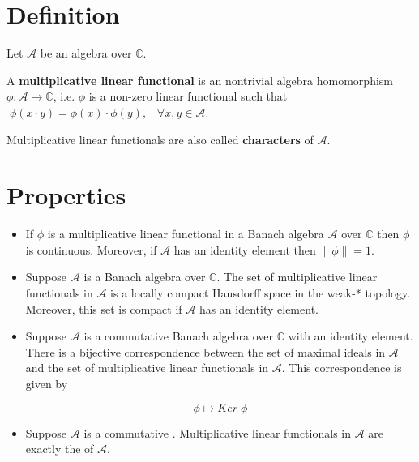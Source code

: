 \documentclass[12pt]{article}
\begin{document}
\section{Definition}
Let $\mathcal{A}$ be an algebra over $\mathbb{C}$.

A {\bf multiplicative linear functional} is an nontrivial algebra homomorphism $\phi :\mathcal{A} \longrightarrow
 \mathbb{C}$, i.e. $\phi$ is a non-zero linear functional such that $\;\phi(x\cdot y) = \phi(x)\cdot\phi(y), \;\;\;\forall x,y \in \mathcal{A}$.

Multiplicative linear functionals are also called {\bf characters} of $\mathcal{A}$.

\section{Properties}

\begin{itemize}
\item If $\phi$ is a multiplicative linear functional in a Banach algebra $\mathcal{A}$ over $\mathbb{C}$ then $\phi$ is continuous. Moreover, if $\mathcal{A}$ has an identity element then $\|\phi\| = 1$.
\end{itemize}

\begin{itemize}
\item Suppose $\mathcal{A}$ is a Banach algebra over $\mathbb{C}$. The set of multiplicative linear functionals in $\mathcal{A}$ is a locally compact Hausdorff space in the weak-* topology. Moreover, this set is compact if $\mathcal{A}$
 has an identity element.
\end{itemize}

\begin{itemize}
\item Suppose $\mathcal{A}$ is a commutative Banach algebra over $\mathbb{C}$ with an identity element. There is a bijective correspondence
 between the set of maximal ideals in $\mathcal{A}$ and the set of multiplicative linear functionals
 in $\mathcal{A}$. This correspondence is given by

\begin{displaymath}
\phi \longmapsto Ker\; \phi
\end{displaymath}
\end{itemize}

\begin{itemize}
\item Suppose $\mathcal{A}$ is a commutative . Multiplicative linear functionals in $\mathcal{A}$ are exactly the  of $\mathcal{A}$.
\end{itemize}
\end{document}
